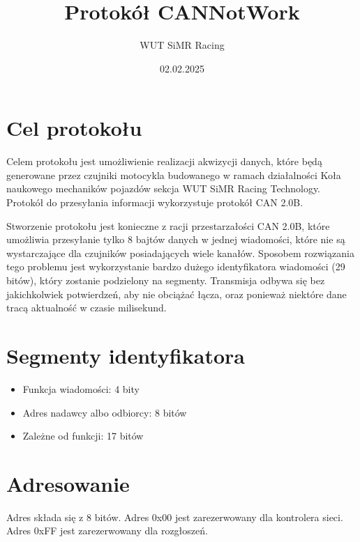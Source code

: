 \documentclass{article}
\title{\Huge Protokół CANNotWork \protocolversion}
\author{WUT SiMR Racing}
\date{02.02.2025}
\begin{document}
\maketitle
\thispagestyle{empty}
\vfill
\begin{center}
\end{center}
\vfill
\newpage
\section*{Cel protokołu}
Celem protokołu jest umożliwienie realizacji akwizycji danych, które będą generowane przez czujniki motocykla budowanego w ramach działalności Koła naukowego mechaników pojazdów sekcja WUT SiMR Racing Technology. Protokół do przesyłania informacji wykorzystuje protokół CAN 2.0B.

Stworzenie protokołu jest konieczne z racji przestarzałości CAN 2.0B, które umożliwia przesyłanie tylko 8 bajtów danych w jednej wiadomości, które nie są wystarczające dla czujników posiadających wiele kanałów. Sposobem rozwiązania tego problemu jest wykorzystanie bardzo dużego identyfikatora wiadomości (29 bitów), który zostanie podzielony na segmenty. Transmisja odbywa się bez jakichkolwiek potwierdzeń, aby nie obciążać łącza, oraz ponieważ niektóre dane tracą aktualność w czasie milisekund.

\section*{Segmenty identyfikatora}
\begin{itemize}
    \item Funkcja wiadomości: 4 bity
    \item Adres nadawcy albo odbiorcy: 8 bitów
    \item Zależne od funkcji: 17 bitów
\end{itemize}

\section*{Adresowanie}
Adres składa się z 8 bitów. 
Adres 0x00 jest zarezerwowany dla kontrolera sieci. 
Adres 0xFF jest zarezerwowany dla rozgłoszeń.
\end{document}
